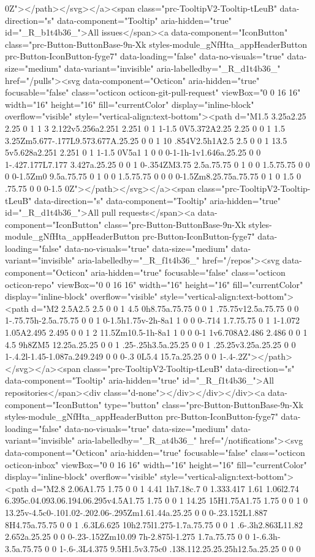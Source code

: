 0Z"></path></svg></a><span class="prc-TooltipV2-Tooltip-tLeuB" data-direction="s" data-component="Tooltip" aria-hidden="true" id="_R_b1t4b36_">All issues</span><a data-component="IconButton" class="prc-Button-ButtonBase-9n-Xk styles-module_gNfHta_appHeaderButton prc-Button-IconButton-fyge7" data-loading="false" data-no-visuals="true" data-size="medium" data-variant="invisible" aria-labelledby="_R_d1t4b36_" href="/pulls"><svg data-component="Octicon" aria-hidden="true" focusable="false" class="octicon octicon-git-pull-request" viewBox="0 0 16 16" width="16" height="16" fill="currentColor" display="inline-block" overflow="visible" style="vertical-align:text-bottom"><path d="M1.5 3.25a2.25 2.25 0 1 1 3 2.122v5.256a2.251 2.251 0 1 1-1.5 0V5.372A2.25 2.25 0 0 1 1.5 3.25Zm5.677-.177L9.573.677A.25.25 0 0 1 10 .854V2.5h1A2.5 2.5 0 0 1 13.5 5v5.628a2.251 2.251 0 1 1-1.5 0V5a1 1 0 0 0-1-1h-1v1.646a.25.25 0 0 1-.427.177L7.177 3.427a.25.25 0 0 1 0-.354ZM3.75 2.5a.75.75 0 1 0 0 1.5.75.75 0 0 0 0-1.5Zm0 9.5a.75.75 0 1 0 0 1.5.75.75 0 0 0 0-1.5Zm8.25.75a.75.75 0 1 0 1.5 0 .75.75 0 0 0-1.5 0Z"></path></svg></a><span class="prc-TooltipV2-Tooltip-tLeuB" data-direction="s" data-component="Tooltip" aria-hidden="true" id="_R_d1t4b36_">All pull requests</span><a data-component="IconButton" class="prc-Button-ButtonBase-9n-Xk styles-module_gNfHta_appHeaderButton prc-Button-IconButton-fyge7" data-loading="false" data-no-visuals="true" data-size="medium" data-variant="invisible" aria-labelledby="_R_f1t4b36_" href="/repos"><svg data-component="Octicon" aria-hidden="true" focusable="false" class="octicon octicon-repo" viewBox="0 0 16 16" width="16" height="16" fill="currentColor" display="inline-block" overflow="visible" style="vertical-align:text-bottom"><path d="M2 2.5A2.5 2.5 0 0 1 4.5 0h8.75a.75.75 0 0 1 .75.75v12.5a.75.75 0 0 1-.75.75h-2.5a.75.75 0 0 1 0-1.5h1.75v-2h-8a1 1 0 0 0-.714 1.7.75.75 0 1 1-1.072 1.05A2.495 2.495 0 0 1 2 11.5Zm10.5-1h-8a1 1 0 0 0-1 1v6.708A2.486 2.486 0 0 1 4.5 9h8ZM5 12.25a.25.25 0 0 1 .25-.25h3.5a.25.25 0 0 1 .25.25v3.25a.25.25 0 0 1-.4.2l-1.45-1.087a.249.249 0 0 0-.3 0L5.4 15.7a.25.25 0 0 1-.4-.2Z"></path></svg></a><span class="prc-TooltipV2-Tooltip-tLeuB" data-direction="s" data-component="Tooltip" aria-hidden="true" id="_R_f1t4b36_">All repositories</span><div class="d-none"></div></div></div><a data-component="IconButton" type="button" class="prc-Button-ButtonBase-9n-Xk styles-module_gNfHta_appHeaderButton prc-Button-IconButton-fyge7" data-loading="false" data-no-visuals="true" data-size="medium" data-variant="invisible" aria-labelledby="_R_at4b36_" href="/notifications"><svg data-component="Octicon" aria-hidden="true" focusable="false" class="octicon octicon-inbox" viewBox="0 0 16 16" width="16" height="16" fill="currentColor" display="inline-block" overflow="visible" style="vertical-align:text-bottom"><path d="M2.8 2.06A1.75 1.75 0 0 1 4.41 1h7.18c.7 0 1.333.417 1.61 1.06l2.74 6.395c.04.093.06.194.06.295v4.5A1.75 1.75 0 0 1 14.25 15H1.75A1.75 1.75 0 0 1 0 13.25v-4.5c0-.101.02-.202.06-.295Zm1.61.44a.25.25 0 0 0-.23.152L1.887 8H4.75a.75.75 0 0 1 .6.3L6.625 10h2.75l1.275-1.7a.75.75 0 0 1 .6-.3h2.863L11.82 2.652a.25.25 0 0 0-.23-.152Zm10.09 7h-2.875l-1.275 1.7a.75.75 0 0 1-.6.3h-3.5a.75.75 0 0 1-.6-.3L4.375 9.5H1.5v3.75c0 .138.112.25.25.25h12.5a.25.25 0 0 0 